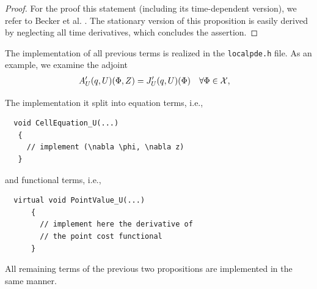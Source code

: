 \documentclass[prodmode,acmtoms]{acmsmall}
\numberwithin{equation}{section}
\renewcommand{\phi}{\varphi}
\begin{document}
\begin{proof}
  For the proof this statement (including its time-dependent version), we refer to 
  Becker et al. \cite{BeMeVe06}.
  The stationary version of this proposition is easily derived by neglecting 
  all time derivatives, which concludes the assertion. 
\end{proof}
The implementation of all previous terms 
is realized in the \texttt{localpde.h} file.
As an example, we examine the adjoint 
\begin{equation}
  \label{opt_KKT_system}
  \begin{aligned}
    A_{U}'(q,U)(\Phi , Z) &= J'_{U}(q,U)(\Phi) & \forall \Phi&\in {\cal X},
  \end{aligned}
\end{equation}

The implementation it split into equation terms, i.e., 
\begin{lstlisting} 
  void CellEquation_U(...)
   {
     // implement (\nabla \phi, \nabla z)
   }
\end{lstlisting}
and functional terms, i.e.,     
\begin{lstlisting} 
  virtual void PointValue_U(...)
      {
        // implement here the derivative of 
        // the point cost functional
      }
\end{lstlisting}
All remaining terms of the previous two propositions 
are implemented in the same manner.
\end{document}
